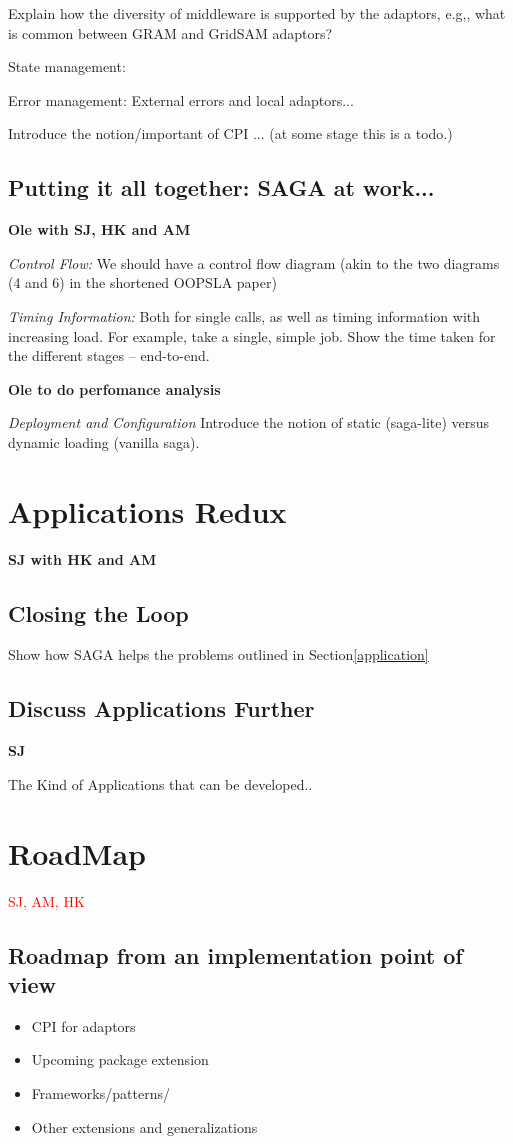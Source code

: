\documentclass[10pt,letterpaper]{article}
\newcommand{\note}[1]{ {\textcolor{red}    { #1 }}}
\newcommand{\note}[1]{}
\begin{document}
Explain how the diversity of middleware is supported by the adaptors,
e.g,, what is common between GRAM and GridSAM adaptors?

State management:

Error management: External errors and local adaptors...

Introduce the notion/important of CPI ... (at some stage this is a
todo.)

\subsection{Putting it all together: SAGA at work...}{\bf Ole with SJ,
  HK and AM}

{\it Control Flow:} We should have a control flow diagram (akin to the
two diagrams (4 and 6) in the shortened OOPSLA paper)

{\it Timing Information:} Both for single calls, as well as timing
information with increasing load.  For example, take a single, simple
job. Show the time taken for the different stages -- end-to-end.

{\bf Ole to do perfomance analysis}

{\it Deployment and Configuration} Introduce the notion of static
(saga-lite) versus dynamic loading (vanilla saga).

\section{Applications Redux}{\bf SJ with HK and AM}

\subsection{Closing the Loop}

Show how SAGA helps the problems outlined in Section\ref{application}

\subsection{Discuss Applications Further} {\bf SJ}
 
The Kind of Applications that can be developed..

\section{RoadMap} \note{SJ, AM, HK}

\subsection*{Roadmap from an implementation point of view}
\begin{itemize}
\item CPI for adaptors
\item Upcoming package extension
\item Frameworks/patterns/
\item Other extensions and generalizations
\end{itemize}
\end{document}

